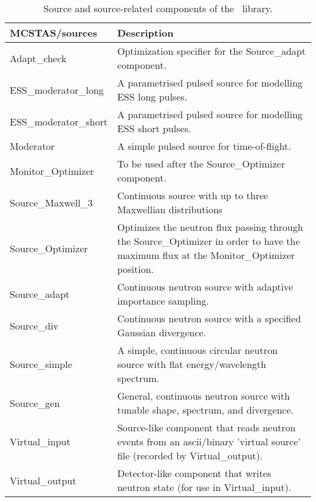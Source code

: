 \begin{table}
  \begin{center}
    {\let\my=\\
    \begin{tabular}{|p{}|p{}|}
      \hline
       {\bf MCSTAS/sources} & Description \\
       \hline
Adapt\_check & Optimization specifier for the Source\_adapt component. \\
ESS\_moderator\_long & A parametrised pulsed source for modelling ESS long pulses. \\
ESS\_moderator\_short & A parametrised pulsed source for modelling ESS short pulses. \\
Moderator  & A simple pulsed source for time-of-flight. \\
Monitor\_Optimizer &  To be used after the Source\_Optimizer component. \\
Source\_Maxwell\_3 & Continuous source with up to three Maxwellian distributions \\
Source\_Optimizer & Optimizes the neutron flux passing through the Source\_Optimizer in order to have the maximum flux at the Monitor\_Optimizer position. \\
Source\_adapt  &       Continuous neutron source with adaptive importance sampling. \\
Source\_div &          Continuous neutron source with a specified Gaussian divergence. \\
Source\_simple &  A simple, continuous circular neutron source with flat energy/wavelength spectrum.\\
Source\_gen     &    General, continuous neutron source with tunable shape, spectrum,
                     and divergence. \\
Virtual\_input &  Source-like component that reads neutron events
                  from an ascii/binary 'virtual source' file (recorded by Virtual\_output). \\
Virtual\_output &  Detector-like component that writes neutron state
                   (for use in Virtual\_input). \\
      \hline
    \end{tabular}
    \caption{Source and source-related components of the \MCS\ library.}
    \label{t:comp-sources}
    }
  \end{center}
\end{table}


